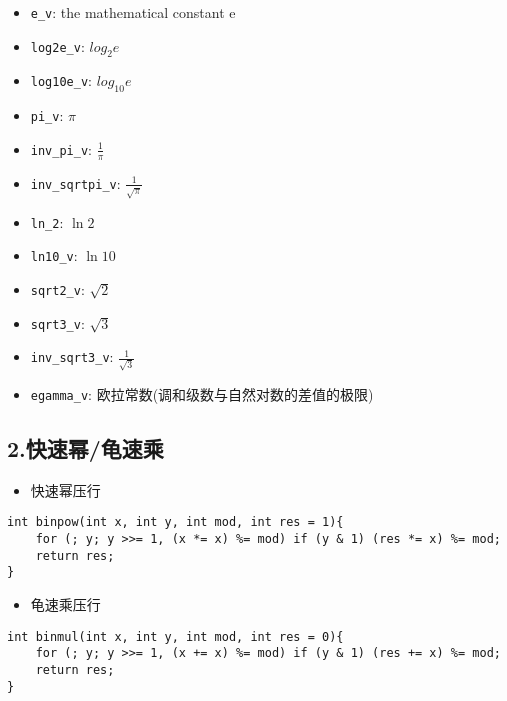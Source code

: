 \documentclass[]{article}
\providecommand{\tightlist}{%
  \setlength{\itemsep}{0pt}\setlength{\parskip}{0pt}}
\begin{document}
\begin{itemize}
\tightlist
\item
  \texttt{e\_v}: the mathematical constant e
\item
  \texttt{log2e\_v}: \(log_2e\)
\item
  \texttt{log10e\_v}: \(log_{10}e\)
\item
  \texttt{pi\_v}: \(\pi\)
\item
  \texttt{inv\_pi\_v}: \(\frac{1}{\pi}\)
\item
  \texttt{inv\_sqrtpi\_v}: \(\frac{1}{\sqrt{\pi}}\)
\item
  \texttt{ln\_2}: \(\ln 2\)
\item
  \texttt{ln10\_v}: \(\ln10\)
\item
  \texttt{sqrt2\_v}: \(\sqrt{2}\)
\item
  \texttt{sqrt3\_v}: \(\sqrt{3}\)
\item
  \texttt{inv\_sqrt3\_v}: \(\frac{1}{\sqrt{3}}\)
\item
  \texttt{egamma\_v}: 欧拉常数(调和级数与自然对数的差值的极限)
\end{itemize}

\hypertarget{ux5febux901fux5e42ux9f9fux901fux4e58}{%
\subsection{2.快速幂/龟速乘}\label{ux5febux901fux5e42ux9f9fux901fux4e58}}

\begin{itemize}
\tightlist
\item
  快速幂压行
\end{itemize}

\begin{verbatim}
int binpow(int x, int y, int mod, int res = 1){
    for (; y; y >>= 1, (x *= x) %= mod) if (y & 1) (res *= x) %= mod;
    return res;
}
\end{verbatim}

\begin{itemize}
\tightlist
\item
  龟速乘压行
\end{itemize}

\begin{verbatim}
int binmul(int x, int y, int mod, int res = 0){
    for (; y; y >>= 1, (x += x) %= mod) if (y & 1) (res += x) %= mod;
    return res;
}
\end{verbatim}
\end{document}
